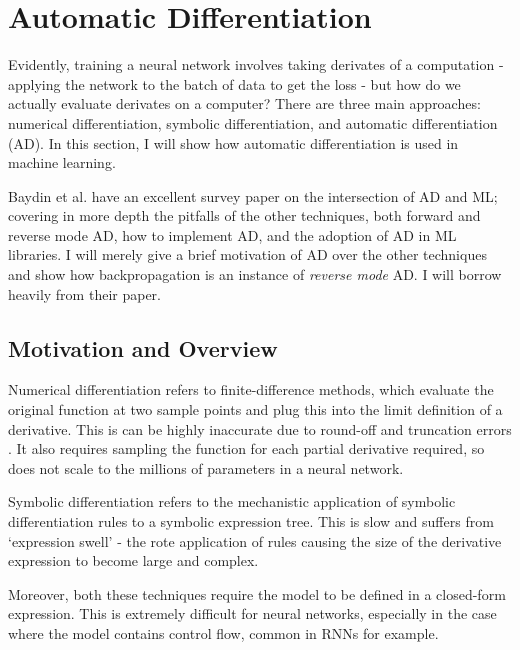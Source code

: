 \section{Automatic Differentiation}
Evidently, training a neural network involves taking derivates of a computation - applying the network to the batch of data to get the loss -
but how do we actually evaluate derivates on a computer?
There are three main approaches: numerical differentiation, symbolic differentiation, and automatic differentiation (AD).
In this section, I will show how automatic differentiation is used in machine learning.

Baydin et al. \cite{Baydin2015} have an excellent survey paper on the intersection of AD and ML;
covering in more depth the pitfalls of the other techniques, both forward and reverse mode AD, how to implement AD, and the adoption of AD in ML libraries.
I will merely give a brief motivation of AD over the other techniques and show how backpropagation is an instance of \textit{reverse mode} AD. I will borrow heavily from their paper.

\subsection{Motivation and Overview}
Numerical differentiation refers to finite-difference methods, which evaluate the original function at two sample points and plug this into the limit definition of a derivative.
This is can be highly inaccurate due to round-off and truncation errors \cite{Jerrell1997}.
It also requires sampling the function for each partial derivative required, so does not scale to the millions of parameters in a neural network.

Symbolic differentiation refers to the mechanistic application of symbolic differentiation rules to a symbolic expression tree.
This is slow and suffers from `expression swell' \cite{Juedes1991} - the rote application of rules causing the size of the derivative expression to become large and complex.

Moreover, both these techniques require the model to be defined in a closed-form expression.
This is extremely difficult for neural networks, especially in the case where the model contains control flow, common in RNNs for example.

